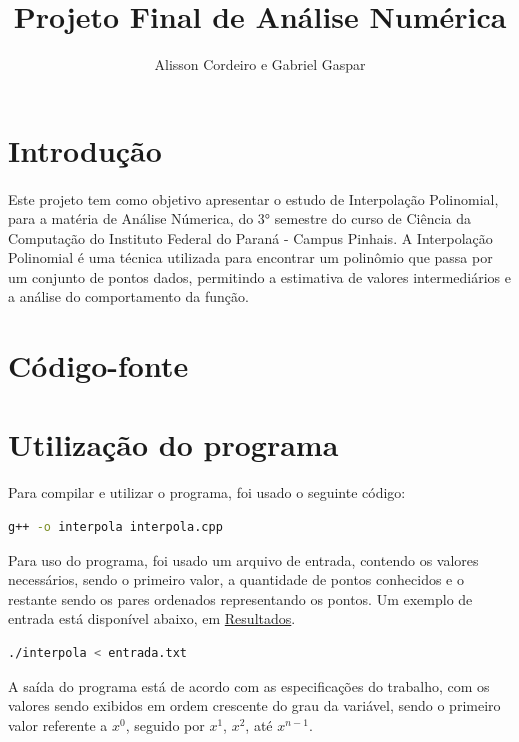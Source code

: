 \documentclass{article}
\title{Projeto Final de Análise Numérica}
\author{Alisson Cordeiro e Gabriel Gaspar}
\date{}
\begin{document}
\maketitle

\section{Introdução}
\paragraph{} Este projeto tem como objetivo apresentar o estudo de Interpolação Polinomial, para a matéria de Análise Númerica, do 3° semestre do curso de Ciência da Computação do Instituto Federal do Paraná - Campus Pinhais. A Interpolação Polinomial é uma técnica utilizada para encontrar um polinômio que passa por um conjunto de pontos dados, permitindo a estimativa de valores intermediários e a análise do comportamento da função.

\section{Código-fonte}


\section{Utilização do programa}
\paragraph{} Para compilar e utilizar o programa, foi usado o seguinte código:

\begin{lstlisting}[language=bash]
    g++ -o interpola interpola.cpp
\end{lstlisting}

Para uso do programa, foi usado um arquivo de entrada, contendo os valores necessários, sendo o primeiro valor, a quantidade de pontos conhecidos e o restante sendo os pares ordenados representando os pontos. Um exemplo de entrada está disponível abaixo, em \hyperref[sec:resultados]{Resultados}.

\begin{lstlisting}[language=bash]
    ./interpola < entrada.txt
\end{lstlisting}

A saída do programa está de acordo com as especificações do trabalho, com os valores sendo exibidos em ordem crescente do grau da variável, sendo o primeiro valor referente a \( x^0 \), seguido por \( x^1 \), \( x^2 \), até \( x^{n-1} \).
\end{document}
